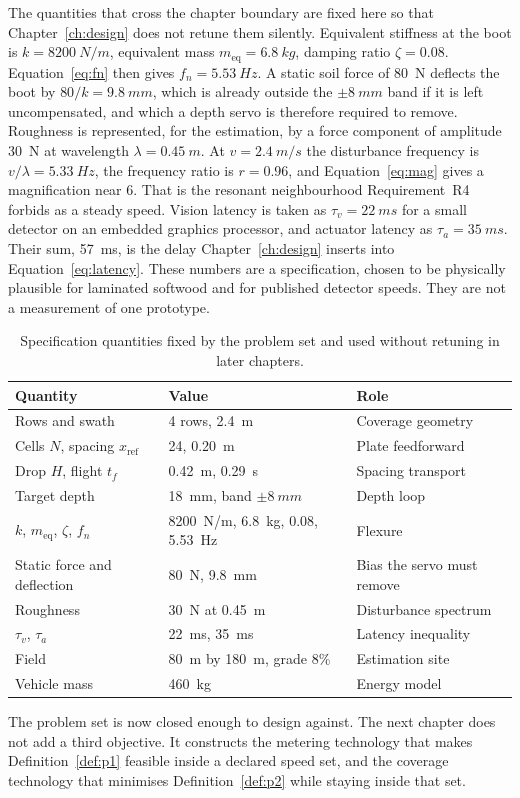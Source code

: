 The quantities that cross the chapter boundary are fixed here so that Chapter~\ref{ch:design} does not retune them silently. Equivalent stiffness at the boot is \(k=\SI{8200}{N/m}\), equivalent mass \(m_{\mathrm{eq}}=\SI{6.8}{kg}\), damping ratio \(\zeta=0.08\). Equation~\eqref{eq:fn} then gives \(f_n=\SI{5.53}{Hz}\). A static soil force of \SI{80}{N} deflects the boot by \(80/k=\SI{9.8}{mm}\), which is already outside the \(\pm\SI{8}{mm}\) band if it is left uncompensated, and which a depth servo is therefore required to remove. Roughness is represented, for the estimation, by a force component of amplitude \SI{30}{N} at wavelength \(\lambda=\SI{0.45}{m}\). At \(v=\SI{2.4}{m/s}\) the disturbance frequency is \(v/\lambda=\SI{5.33}{Hz}\), the frequency ratio is \(r=0.96\), and Equation~\eqref{eq:mag} gives a magnification near \(6\). That is the resonant neighbourhood Requirement~R4 forbids as a steady speed. Vision latency is taken as \(\tau_v=\SI{22}{ms}\) for a small detector on an embedded graphics processor, and actuator latency as \(\tau_a=\SI{35}{ms}\). Their sum, \SI{57}{ms}, is the delay Chapter~\ref{ch:design} inserts into Equation~\eqref{eq:latency}. These numbers are a specification, chosen to be physically plausible for laminated softwood and for published detector speeds. They are not a measurement of one prototype.

\begin{table}[ht]
\centering
\caption{Specification quantities fixed by the problem set and used without retuning in later chapters.}
\label{tab:spec}
\begin{tabular}{@{}lll@{}}
\toprule
Quantity & Value & Role \\
\midrule
Rows and swath & 4 rows, \SI{2.4}{m} & Coverage geometry \\
Cells \(N\), spacing \(x_{\mathrm{ref}}\) & 24, \SI{0.20}{m} & Plate feedforward \\
Drop \(H\), flight \(t_f\) & \SI{0.42}{m}, \SI{0.29}{s} & Spacing transport \\
Target depth & \SI{18}{mm}, band \(\pm\SI{8}{mm}\) & Depth loop \\
\(k\), \(m_{\mathrm{eq}}\), \(\zeta\), \(f_n\) & \SI{8200}{N/m}, \SI{6.8}{kg}, \num{0.08}, \SI{5.53}{Hz} & Flexure \\
Static force and deflection & \SI{80}{N}, \SI{9.8}{mm} & Bias the servo must remove \\
Roughness & \SI{30}{N} at \SI{0.45}{m} & Disturbance spectrum \\
\(\tau_v\), \(\tau_a\) & \SI{22}{ms}, \SI{35}{ms} & Latency inequality \\
Field & \SI{80}{m} by \SI{180}{m}, grade \num{8}\% & Estimation site \\
Vehicle mass & \SI{460}{kg} & Energy model \\
\bottomrule
\end{tabular}
\end{table}

The problem set is now closed enough to design against. The next chapter does not add a third objective. It constructs the metering technology that makes Definition~\ref{def:p1} feasible inside a declared speed set, and the coverage technology that minimises Definition~\ref{def:p2} while staying inside that set.
